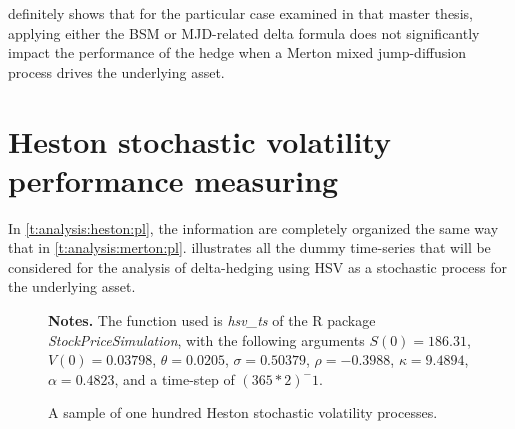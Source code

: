 \documentclass[a4paper, 12pt]{report}
\begin{document}
 definitely shows that for the particular case examined in that master thesis, applying either the BSM or MJD-related delta formula does not significantly impact the performance of the hedge when a Merton mixed jump-diffusion process drives the underlying asset.



















































\section{Heston stochastic volatility performance measuring}
\label{sec:section name}


In \cref{t:analysis:heston:pl}, the information are completely organized the same way that in \cref{t:analysis:merton:pl}. 
 illustrates all the dummy time-series that will be considered for the analysis of delta-hedging using HSV as a stochastic process for the underlying asset.


\begin{figure}[ht]
  \centering
  
  \caption{A sample of one hundred Heston stochastic volatility processes.}
  \begin{changemargin}{0.5cm}{0.5cm}
  \medskip
\footnotesize
{}\textbf{Notes.} The function used is \textit{hsv\_ts} of the R package \textit{StockPriceSimulation}, with the following arguments $S(0) = 186.31$,  $V(0) = 0.03798$, $\theta = 0.0205$, $\sigma = 0.50379$, $\rho = -0.3988$,  $\kappa = 9.4894$, $\alpha  = 0.4823$, and a time-step of $(365 * 2)^-1$.
  \end{changemargin}
  \label{p:analysis:hsv:100}
\end{figure}
\end{document}
